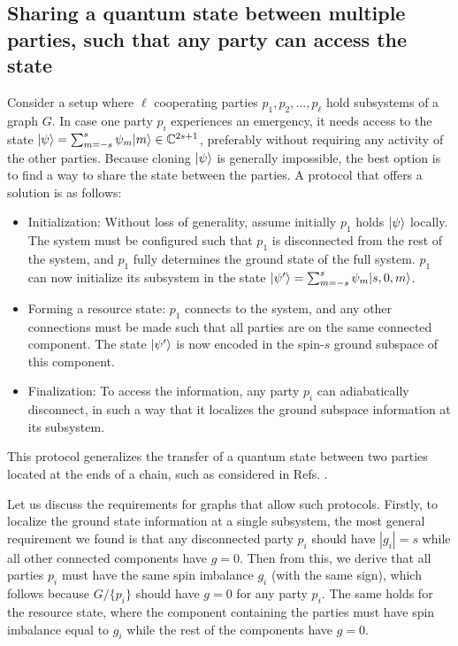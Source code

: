 \subsection{Sharing a quantum state between multiple parties, such that any party can access the state}
Consider a setup where $\ell$ cooperating parties $p_1, p_2, \ldots, p_\ell$ hold subsystems of a graph $G$. In case one party $p_i$ experiences an emergency, it needs access to the state $\lvert\psi\rangle = \sum_{m=-s}^s \psi_m \lvert m\rangle \in \mathbb{C}^{2s+1}$, preferably without requiring any activity of the other parties. Because cloning $\lvert\psi\rangle$ is generally impossible, the best option is to find a way to share the state between the parties. A protocol that offers a solution is as follows:


\begin{itemize}
\item Initialization: Without loss of generality, assume initially $p_1$ holds $\lvert\psi\rangle$ locally. The system must be configured such that $p_1$ is disconnected from the rest of the system, and $p_1$ fully determines the ground state of the full system. $p_1$ can now initialize its subsystem in the state $\lvert\psi'\rangle = \sum_{m=-s}^s \psi_m \lvert s,0,m\rangle$. 
\item Forming a resource state: $p_1$ connects to the system, and any other connections must be made such that all parties are on the same connected component. The state $\lvert\psi'\rangle$ is now encoded in the spin-$s$ ground subspace of this component. 
\item Finalization: To access the information, any party ${p_i}$ can adiabatically disconnect, in such a way that it localizes the ground subspace information at its subsystem.
\end{itemize}
This protocol generalizes the transfer of a quantum state between two parties located at the ends of a chain, such as considered in Refs. \cite{Oh2013,Agundez2017}.

Let us discuss the requirements for graphs that allow such protocols. Firstly, to localize the ground state information at a single subsystem, the most general requirement we found is that any disconnected party $p_i$ should have $|g_i| = s$ while all other connected components have $g=0$. Then from this, we derive that all parties $p_i$ must have the same spin imbalance $g_i$ (with the same sign), which follows because $G / \{ p_i \}$ should have $g=0$ for any party $p_i$. The same holds for the resource state, where the component containing the parties must have spin imbalance equal to $g_i$ while the rest of the components have $g=0$. 

